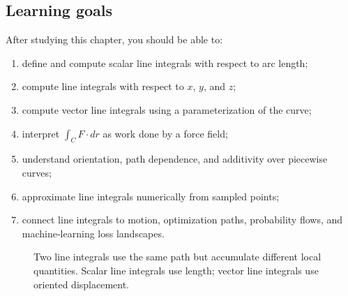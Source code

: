 \documentclass[11pt,oneside]{book}
\newcommand{\norm}[1]{\left\lVert #1\right\rVert}
\begin{document}
\subsection*{Learning goals}
After studying this chapter, you should be able to:
\begin{enumerate}
  \item define and compute scalar line integrals with respect to arc length;
  \item compute line integrals with respect to $x$, $y$, and $z$;
  \item compute vector line integrals using a parameterization of the curve;
  \item interpret $\int_C F\cdot dr$ as work done by a force field;
  \item understand orientation, path dependence, and additivity over piecewise curves;
  \item approximate line integrals numerically from sampled points;
  \item connect line integrals to motion, optimization paths, probability flows, and machine-learning loss landscapes.
\end{enumerate}

\begin{figure}[H]
\centering
{}
\caption{Two line integrals use the same path but accumulate different local quantities. Scalar line integrals use length; vector line integrals use oriented displacement.}
\end{figure}
\end{document}
